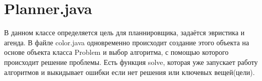 \documentclass{article}
\begin{document}
\section*{\hypertarget{Planner}{Planner.java}}
В данном классе определяется цель для планнировщика, задаётся эвристика и агенда. В файле color.java одновременно происходит создание этого объекта на основе объекта класса Problem и выбор алгоритма, с помощью которого происходит решение проблемы. Есть функция solve, которая уже запускает работу алгоритмов и выкидывает ошибки если нет решения или ключевых вещей(цели).
\end{document}
